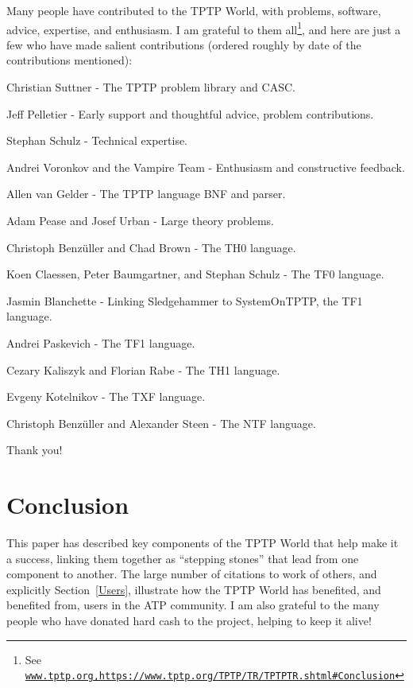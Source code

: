 \documentclass{easychair}
\newenvironment{packed_itemize}{
\vspace*{-0.2em}
\begin{itemize}
\setlength{\partopsep}{0pt}
\setlength{\itemsep}{1pt}
\setlength{\parskip}{0pt}
\setlength{\parsep}{0pt}
}{\end{itemize}}
\begin{document}
Many people have contributed to the TPTP World, with problems, software, advice, expertise,
and enthusiasm. 
I am grateful to them all\footnote{%
See \href{http://www.tptp.org,https://www.tptp.org/TPTP/TR/TPTPTR.shtml\#Conclusion}{{\tt www.tptp.org,https://www.tptp.org/TPTP/TR/TPTPTR.shtml\#Conclusion}}}, 
and here are just a few who have made salient contributions (ordered roughly by date of the 
contributions mentioned):
\begin{packed_itemize}
\item Christian Suttner - The TPTP problem library and CASC.                 %
\item Jeff Pelletier - Early support and thoughtful advice, problem contributions. %
\item Stephan Schulz - Technical expertise.                                      %
\item Andrei Voronkov and the Vampire Team - Enthusiasm and constructive feedback.  %
\item Allen van Gelder - The TPTP language BNF and parser.                    %
\item Adam Pease and Josef Urban - Large theory problems.                     %
\item Christoph Benz{\"u}ller and Chad Brown - The TH0 language.              %
\item Koen Claessen, Peter Baumgartner, and Stephan Schulz - The TF0 language. %
\item Jasmin Blanchette - Linking Sledgehammer to SystemOnTPTP, the TF1 language.     %
\item Andrei Paskevich - The TF1 language.                                    %
\item Cezary Kaliszyk and Florian Rabe - The TH1 language.                    %
\item Evgeny Kotelnikov - The TXF language.                                   %
\item Christoph Benz{\"u}ller and Alexander Steen - The NTF language.         %
\end{packed_itemize}
Thank you!

\section{Conclusion}
\label{Conclusion}

This paper has described key components of the TPTP World that help make it a success,
linking them together as ``stepping stones'' that lead from one component to another.
The large number of citations to work of others, and explicitly Section~\ref{Users}, 
illustrate how the TPTP World has benefited, and benefited from, users in the ATP community.
I am also grateful to the many people who have donated hard cash to the project, helping
to keep it alive!
\end{document}
